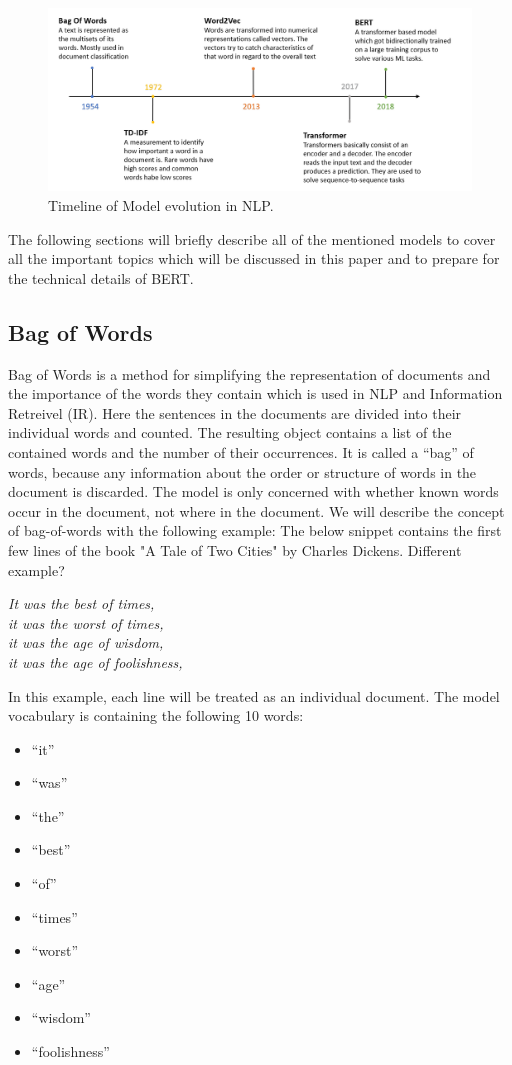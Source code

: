 \begin{figure}[H]
	\centering
	\includegraphics[width=1\textwidth]{figures/timeline_NLP.PNG}
	\caption{Timeline of Model evolution in NLP.}
	\label{fig:timeline}
\end{figure}

The following sections will briefly describe all of the mentioned models to cover all the important topics which will be discussed in this paper and to prepare for the technical details of BERT.

\subsection{Bag of Words}
Bag of Words is a method for simplifying the representation of documents and the importance of the words they contain which is used in NLP and Information Retreivel (IR). Here the sentences in the documents are divided into their individual words and counted. The resulting object contains a list of the contained words and the number of their occurrences. It is called a “bag” of words, because any information about the order or structure of words in the document is discarded. The model is only concerned with whether known words occur in the document, not where in the document. We will describe the concept of bag-of-words with the following example: The below snippet contains the first few lines of \alert{the book "A Tale of Two Cities" by Charles Dickens. Different example?}


\textit{
\centering	
It was the best of times,\\
it was the worst of times,\\
it was the age of wisdom,\\
it was the age of foolishness, \\
}

In this example, each line will be treated as an individual document. The model vocabulary is containing the following 10 words:
\begin{itemize}
	\item “it”
	\item “was”
	\item “the”
	\item “best”
	\item “of”
	\item “times”
	\item “worst”
	\item “age”
	\item “wisdom”
	\item “foolishness”
\end{itemize}

